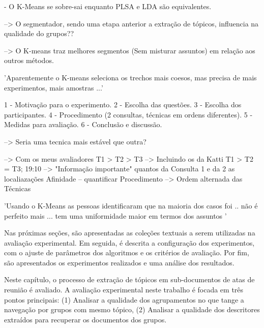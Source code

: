  - O K-Means se sobre-sai enquanto PLSA e LDA são equivalentes.

--> O segmentador, sendo uma etapa anterior a extração de tópicos, influencia na qualidade do grupos??

--> O K-means traz melhores segmentos (Sem misturar assuntos) em relação aos outros métodos.

'Aparentemente o K-means seleciona os trechos mais coesos, mas precisa de mais experimentos, mais amostras ...'


 1 - Motivação para o experimento.
 2 - Escolha das questões.
 3 - Escolha dos participantes.
 4 - Procedimento (2 consultas, técnicas em ordens diferentes).
 5 - Medidas para avaliação.
 6 - Conclusão e discussão.



--> Seria uma tecnica mais estável que outra? 


--> Com os meus avaliadores T1 > T2 > T3
--> Incluindo os da Katti   T1 > T2 = T3;
19:10 --> "Informação importante"
quantos da Consulta 1 e da 2
as localiazações
Afinidade -- quantificar
Procedimento --> Ordem alternada das Técnicas





'Usando o K-Means as pessoas identificaram que na maioria dos casos foi .. não é perfeito mais ... tem uma uniformidade maior em termos dos assuntos '





Nas próximas seções, são apresentadas as coleções textuais a serem utilizadas na avaliação experimental. Em seguida, é descrita a configuração dos experimentos, com o ajuste de parâmetros dos algoritmos e os critérios de avaliação. Por fim, são apresentados os experimentos realizados e uma análise dos resultados.


Neste capítulo, o processo de extração de tópicos em sub-documentos de atas de reunião é avaliado. A avaliação experimental neste trabalho é focada em três pontos principais: 
(1) Analisar a qualidade dos agrupamentos no que tange a navegação por grupos com mesmo tópico, 
(2) Analisar a qualidade dos descritores extraídos para recuperar os documentos dos grupos.





